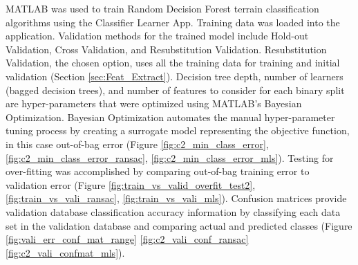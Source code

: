 \documentclass[numbered,pdftex]{ohio-etd}
\begin{document}
{{{		{MATLAB was used to train Random Decision Forest terrain classification algorithms using the Classifier Learner App. Training data was loaded into the application. Validation methods for the trained model include Hold-out Validation, Cross Validation, and Resubstitution Validation. Resubstitution Validation, the chosen option, uses all the training data for training and initial validation (Section \ref{sec:Feat_Extract}). Decision tree depth, number of learners (bagged decision trees), and number of features to consider for each binary split are hyper-parameters that were optimized using MATLAB's Bayesian Optimization. Bayesian Optimization automates the manual hyper-parameter tuning process by creating a surrogate model representing the objective function, in this case out-of-bag error (Figure \ref{fig:c2_min_class_error}, \ref{fig:c2_min_class_error_ransac}, \ref{fig:c2_min_class_error_mls}). Testing for over-fitting was accomplished by comparing out-of-bag training error to validation error (Figure \ref{fig:train_vs_valid_overfit_test2}, \ref{fig:train_vs_vali_ransac}, \ref{fig:train_vs_vali_mls}). Confusion matrices provide validation database classification accuracy information by classifying each data set in the validation database and comparing actual and predicted classes (Figure \ref{fig:vali_err_conf_mat_range} \ref{fig:c2_vali_conf_ransac} \ref{fig:c2_vali_confmat_mls}).} 
		
}}}
\end{document}

